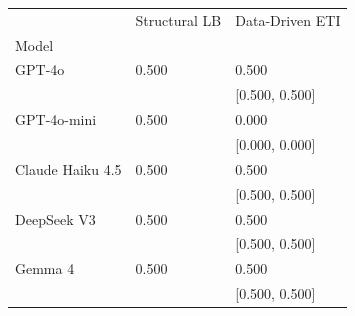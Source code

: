\begin{tabular}{lll}
\toprule
 & Structural LB & Data-Driven ETI \\
Model &  &  \\
\midrule
GPT-4o & 0.500 & 0.500 \\
 &  & [0.500, 0.500] \\
GPT-4o-mini & 0.500 & 0.000 \\
 &  & [0.000, 0.000] \\
Claude Haiku 4.5 & 0.500 & 0.500 \\
 &  & [0.500, 0.500] \\
DeepSeek V3 & 0.500 & 0.500 \\
 &  & [0.500, 0.500] \\
Gemma 4 & 0.500 & 0.500 \\
 &  & [0.500, 0.500] \\
\bottomrule
\end{tabular}
